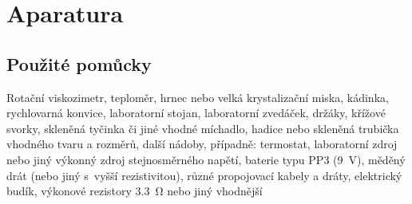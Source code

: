 \documentclass[12pt]{article}
\begin{document}
\newpage
\section{Aparatura}
\subsection{Použité pomůcky}
Rotační viskozimetr, teploměr, hrnec nebo velká krystalizační miska, kádinka, rychlovarná konvice, laboratorní stojan, laboratorní zvedáček, držáky, křížové svorky, skleněná tyčinka či jiné vhodné míchadlo, hadice nebo skleněná trubička vhodného tvaru a rozměrů, další nádoby, případně: termostat, laboratorní zdroj nebo jiný výkonný zdroj stejnosměrného napětí, baterie typu PP3 (\SI{9}{\volt}), měděný drát (nebo jiný s~vyšší rezistivitou), různé propojovací kabely a dráty, elektrický budík, výkonové rezistory \SI{3,3}{\ohm} nebo jiný vhodnější
\end{document}
